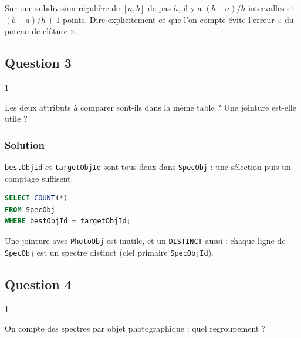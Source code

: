 \documentclass[11pt,a4paper]{article}
\begin{document}
\begin{methode}

Sur une subdivision régulière de \([a, b]\) de pas \(h\), il y a \((b-a)/h\) intervalles et \((b-a)/h + 1\) points. Dire explicitement ce que l'on compte évite l'erreur « du poteau de clôture ».

\end{methode}

\hypertarget{question-3}{%
\subsection{Question 3}\label{question-3}}

\begin{indication}{1}

Les deux attributs à comparer sont-ils dans la même table ? Une jointure est-elle utile ?

\end{indication}

\hypertarget{solution-2}{%
\subsubsection{Solution}\label{solution-2}}

\texttt{bestObjId} et \texttt{targetObjId} sont tous deux dans \texttt{SpecObj} : une sélection puis un comptage suffisent.

\begin{lstlisting}[language=SQL]
SELECT COUNT(*)
FROM SpecObj
WHERE bestObjId = targetObjId;
\end{lstlisting}

\begin{piege}

Une jointure avec \texttt{PhotoObj} est inutile, et un \texttt{DISTINCT} aussi : chaque ligne de \texttt{SpecObj} est un spectre distinct (clef primaire \texttt{SpecObjId}).

\end{piege}

\hypertarget{question-4}{%
\subsection{Question 4}\label{question-4}}

\begin{indication}{1}

On compte des spectres par objet photographique : quel regroupement ?

\end{indication}
\end{document}
